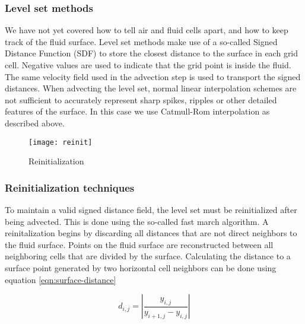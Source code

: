 \documentclass[twocolumn]{article}
\begin{document}
\subsubsection{Level set methods}
We have not yet covered how to tell air and fluid cells apart, and how to keep track of the fluid surface.
Level set methods make use of a so-called Signed Distance Function (SDF) to store the closest distance to the surface in each grid cell. 
Negative values are used to indicate that the grid point is inside the fluid. The same velocity field used in the advection step is used to transport the signed distances. When advecting the level set, normal linear interpolation schemes are not sufficient to accurately represent sharp spikes, ripples or other detailed features of the surface. In this case we use Catmull-Rom interpolation as described above.

\begin{figure}[h]
  \centering
    \texttt{[image: reinit]}
  \caption{Reinitialization}
  \label{fig:reinitialization}
\end{figure}
\subsubsection{Reinitialization techniques}
 To maintain a valid signed distance field, the level set must be reinitialized after being advected. This is done using the so-called fast march algorithm. A reinitalization begins by discarding all distances that are not direct neighbors to the fluid surface. Points on the fluid surface are reconstructed between all neighboring cells that are divided by the surface. Calculating the distance to a surface point generated by two horizontal cell neighbors can be done using equation \ref{eqn:surface-distance}
 
\begin{equation}
    d_{i,j} = |\frac{y_{i,j}}{y_{i+1,j} - y_{i,j}}|
\label{eqn:surface-distance}
\end{equation}
 
\end{document}
